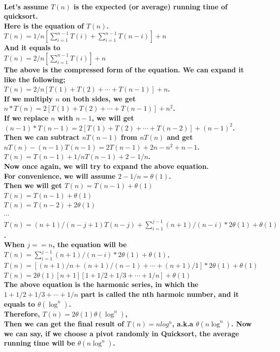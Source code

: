\documentclass{article}
\begin{document}
\paragraph{Let's assume $T(n)$ is the expected (or average) running time of quicksort.\\
Here is the equation of $T(n)$.\\
$T(n) = 1/n [\sum_{i=1}^{n-1} T(i) + \sum_{i=1}^{n-1} T(n-i)] + n$\\
And it equals to\\
$T(n) = 2/n [\sum_{i=1}^{n-1} T(i)] + n$\\
The above is the compressed form of the equation. We can expand it like the following;\\
$T(n) = 2/n [T(1)+T(2)+ \cdots + T(n-1)] + n$.\\
If we multiply $n$ on both sides, we get\\
$n*T(n) = 2[T(1)+T(2)+ \cdots + T(n-1)] + n^2$.\\
If we replace $n$ with $n-1$, we will get\\
$(n-1)*T(n-1) = 2[T(1)+T(2)+ \cdots + T(n-2)] + (n-1)^2$.\\
Then we can subtract $nT(n-1)$ from $nT(n)$ and get\\
$nT(n) - (n-1)T(n-1) = 2T(n-1) + 2n - n^2 + n - 1$.\\
$T(n) = T(n-1) + 1/nT(n-1) + 2 - 1/n$.\\
Now once again, we will try to expand the above equation.\\
For convenience, we will assume $2-1/n = \theta(1)$.\\
Then we will get $T(n) = T(n-1) + \theta(1)$\\
$T(n) = T(n-1) + \theta(1)$\\
$T(n) = T(n-2) + 2\theta(1)$\\
$\cdots$
$T(n) = (n+1)/(n-j+1)T(n-j) + \sum_{i=1}^{j-1} (n+1)/(n-i)*2\theta(1) + \theta(1)$.\\
When $j == n$, the equation will be\\
$T(n) = \sum_{i=1}^{j-1} (n+1)/(n-i)*2\theta(1) + \theta(1)$.\\
$T(n) = [(n+1)/n + (n+1)/(n-1) + \cdots + (n+1)/1]*2\theta(1) + \theta(1)$\\
$T(n) = 2\theta(1)[n+1][1 + 1/2 + 1/3 + \cdots + 1/n] + \theta(1)$\\
The above equation is the harmonic series, in which the $1 + 1/2 + 1/3 + \cdots + 1/n$ part is called the nth harmoic number, 
and it equals to $\theta(\log^n)$.\\
Therefore, $T(n) = 2\theta(1)\theta(\log^n)$,\\
Then we can get the final result of $T(n) = nlog^n$, a.k.a $\theta(n\log^n)$.
Now we can say, if we choose a pivot randomly in Quicksort, the average running time will be $\theta(n\log^n)$.\\}
\end{document}
